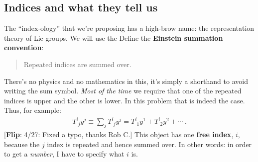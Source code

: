 \documentclass[12pt]{article}
\newcommand{\flip}[1]{{\color{red} [\textbf{Flip}: {#1}]}}
\begin{document}








\subsection{Indices and what they tell us}

The ``index-ology'' that we're proposing has a high-brow name: the representation theory of Lie groups. We will use the Define the \textbf{Einstein summation convention}:
\begin{quote}
	Repeated indices are summed over. 
\end{quote}
 There's no physics and no mathematics in this, it's simply a shorthand to avoid writing the sum symbol. \emph{Most of the time} we require that one of the repeated indices is upper and the other is lower. In this problem that is indeed the case. Thus, for example:
 \begin{align}
 	T^{i}_{\phantom{i}j}y^j \equiv \sum_j T^{i}_{\phantom{i}j}y^j = T^{i}_{\phantom{i}1}y^1 + T^{i}_{\phantom{i}2}y^2 + \cdots \ .
 \end{align}
 \flip{4/27: Fixed a typo, thanks Rob C.}
 This object has one \textbf{free index}, $i$, because the $j$ index is repeated and hence summed over. In other words: in order to get a \emph{number}, I have to specify what $i$ is. 
\end{document}
